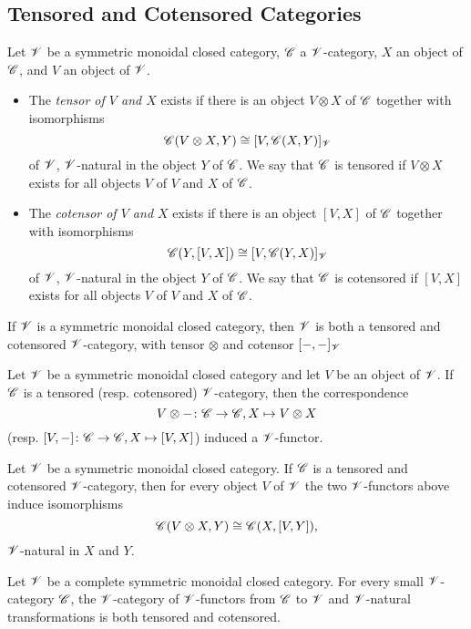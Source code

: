\documentclass[dissertation.tex]{subfiles}
\begin{document}
\subsection{Tensored and Cotensored Categories}

\begin{defn}
  Let $\mathscr{V}$ be a symmetric monoidal closed category, $\mathscr{C}$ a $\mathscr{V}$-category, $X$ an object of $\mathscr{C}$, and $V$ an object of $\mathscr{V}$.
  \begin{itemize}
  \item
    The {\it tensor of $V$ and $X$} exists if there is an object $V \otimes X$ of $\mathscr{C}$ together with isomorphisms
    $$\mathscr{C}(V \otimes X, Y) \cong [V, \mathscr{C}(X,Y)]_{\mathscr{V}}$$
    of $\mathscr{V}$, $\mathscr{V}$-natural in the object $Y$ of $\mathscr{C}$.
    We say that $\mathscr{C}$ is tensored if $V \otimes X$ exists for all objects $V$ of $V$ and $X$ of $\mathscr{C}$.
  \item
    The {\it cotensor of $V$ and $X$} exists if there is an object $[V,X]$ of $\mathscr{C}$ together with isomorphisms
    $$\mathscr{C}(Y, [V,X]) \cong [V, \mathscr{C}(Y,X)]_{\mathscr{V}}$$
    of $\mathscr{V}$, $\mathscr{V}$-natural in the object $Y$ of $\mathscr{C}$.
    We say that $\mathscr{C}$ is cotensored if $[V,X]$ exists for all objects $V$ of $V$ and $X$ of $\mathscr{C}$.
  \end{itemize}
\end{defn}

\begin{prop}
  If $\mathscr{V}$ is a symmetric monoidal closed category, then $\mathscr{V}$ is both a tensored and cotensored $\mathscr{V}$-category, with tensor $\otimes$ and cotensor $[- , -]_{\mathscr{V}}$
\end{prop}

\begin{prop}
  Let $\mathscr{V}$ be a symmetric monoidal closed category and let $V$ be an object of $\mathscr{V}$.
  If $\mathscr{C}$ is a tensored (resp. cotensored) $\mathscr{V}$-category, then the correspondence
  $$V \otimes - \colon \mathscr{C} \to \mathscr{C}, X \mapsto V \otimes X$$
  (resp. $[V, -] \colon \mathscr{C} \to \mathscr{C}, X \mapsto [V, X]$)
  induced a $\mathscr{V}$-functor.
\end{prop}

\begin{prop}
  Let $\mathscr{V}$ be a symmetric monoidal closed category.
  If $\mathscr{C}$ is a tensored and cotensored $\mathscr{V}$-category, then for every object $V$ of $\mathscr{V}$ the two $\mathscr{V}$-functors above induce isomorphisms
  $$\mathscr{C}(V \otimes X, Y) \cong \mathscr{C}(X, [V,Y]),$$
  $\mathscr{V}$-natural in $X$ and $Y$.
\end{prop}

\begin{prop}\label{modulesaretensored}
  Let $\mathscr{V}$ be a complete symmetric monoidal closed category.
  For every small $\mathscr{V}$-category $\mathscr{C}$, the $\mathscr{V}$-category of $\mathscr{V}$-functors from $\mathscr{C}$ to $\mathscr{V}$ and $\mathscr{V}$-natural transformations is both tensored and cotensored.
\end{prop}
\end{document}

